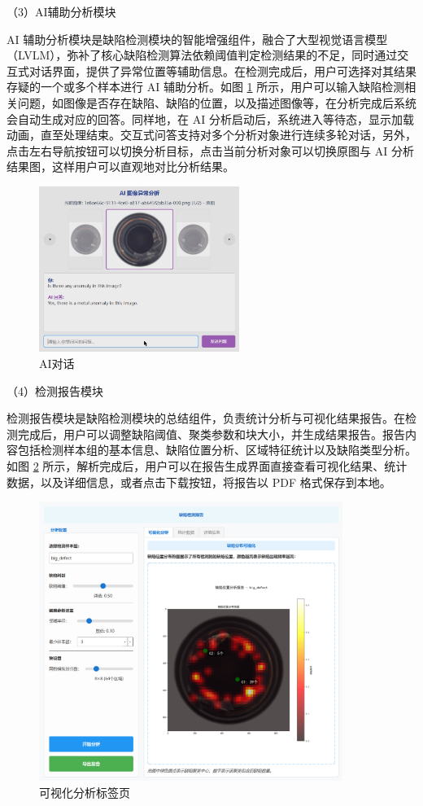 \documentclass[
  ]{njuthesis}
\begin{document}
（3）AI辅助分析模块

AI 辅助分析模块是缺陷检测模块的智能增强组件，融合了大型视觉语言模型（LVLM），弥补了核心缺陷检测算法依赖阈值判定检测结果的不足，同时通过交互式对话界面，提供了异常位置等辅助信息。在检测完成后，用户可选择对其结果存疑的一个或多个样本进行 AI 辅助分析。如图 \ref{AI对话} 所示，用户可以输入缺陷检测相关问题，如图像是否存在缺陷、缺陷的位置，以及描述图像等，在分析完成后系统会自动生成对应的回答。同样地，在 AI 分析启动后，系统进入等待态，显示加载动画，直至处理结束。交互式问答支持对多个分析对象进行连续多轮对话，另外，点击左右导航按钮可以切换分析目标，点击当前分析对象可以切换原图与 AI 分析结果图，这样用户可以直观地对比分析结果。

\begin{figure}[H]
    \centering
    \includegraphics[width=0.58\textwidth]{images/AI对话.png}
    \caption{AI对话}
    \label{AI对话}
\end{figure}

（4）检测报告模块

检测报告模块是缺陷检测模块的总结组件，负责统计分析与可视化结果报告。在检测完成后，用户可以调整缺陷阈值、聚类参数和块大小，并生成结果报告。报告内容包括检测样本组的基本信息、缺陷位置分析、区域特征统计以及缺陷类型分析。如图 \ref{可视化分析标签页} 所示，解析完成后，用户可以在报告生成界面直接查看可视化结果、统计数据，以及详细信息，或者点击下载按钮，将报告以 PDF 格式保存到本地。

\begin{figure}[htb]
    \centering
    \includegraphics[width=0.88\textwidth]{images/可视化分析标签页.png}
    \caption{可视化分析标签页}
    \label{可视化分析标签页}
\end{figure}
\end{document}
